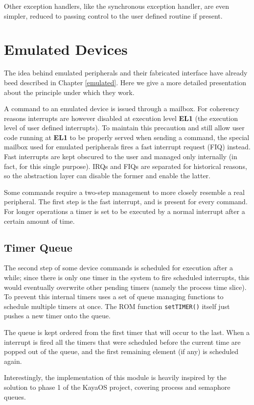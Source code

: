 \documentclass[12pt,a4paper,openright,twoside]{report}
\begin{document}
Other exception handlers, like the synchronous exception handler, are even 
simpler, reduced to passing control to the user defined routine if present.


\section{Emulated Devices}
The idea behind emulated peripherals and their fabricated interface 
have already beed described in Chapter \ref{emulated}. Here we give a more detailed 
presentation about the principle under which they work.

A command to an emulated device is issued through a mailbox. For coherency reasons
interrupts are however disabled at execution level \textbf{EL1} (the execution
level of user defined interrupts). To maintain this precaution and still allow 
user code running at \textbf{EL1} to be properly served when sending a command, the
special mailbox used for emulated peripherals fires a fast interrupt request (FIQ)
instead.
Fast interrupts are kept obscured to the user and managed only internally (in fact,
for this single purpose). IRQs and FIQs are separated for historical reasons, so 
the abstraction layer can disable the former and enable the latter.

Some commands require a two-step management to more closely resemble a real peripheral.
The first step is the fast interrupt, and is present for every command. For longer
operations a timer is set to be executed by a normal interrupt after a certain amount
of time.

\subsection{Timer Queue}
The second step of some device commands is scheduled for execution after a while;
since there is only one timer in the system to fire scheduled interrupts, this would
eventually overwrite other pending timers (namely the process time slice).
To prevent this internal timers uses a set of queue managing functions to 
schedule multiple timers at once. The ROM function {\tt setTIMER()} itself
just pushes a new timer onto the queue.

The queue is kept ordered from the first timer that will occur to the last.
When a interrupt is fired all the timers that were scheduled before the
current time are popped out of the queue, and the first remaining element (if any)
is scheduled again.

Interestingly, the implementation of this module is heavily inspired by the 
solution to phase 1 of the KayaOS project, covering process and semaphore queues.
\end{document}
